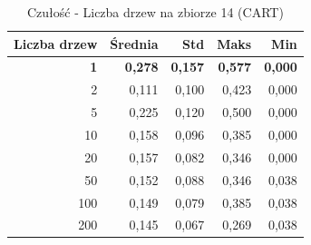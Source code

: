 \begin{table}[htbp]
\centering
\small
\setlength{\tabcolsep}{6pt}
\renewcommand{\arraystretch}{1.2}
\caption{Czułość - Liczba drzew na zbiorze 14 (CART)}
\label{tab:CART_tree_count_14_recall}
\begin{tabular}{r|r|r|r|r}
\toprule
Liczba drzew & Średnia & Std & Maks & Min \\
\hline
\textbf{1} & \textbf{0,278} & \textbf{0,157} & \textbf{0,577} & \textbf{0,000} \\
2 & 0,111 & 0,100 & 0,423 & 0,000 \\
5 & 0,225 & 0,120 & 0,500 & 0,000 \\
10 & 0,158 & 0,096 & 0,385 & 0,000 \\
20 & 0,157 & 0,082 & 0,346 & 0,000 \\
50 & 0,152 & 0,088 & 0,346 & 0,038 \\
100 & 0,149 & 0,079 & 0,385 & 0,038 \\
200 & 0,145 & 0,067 & 0,269 & 0,038 \\
\bottomrule
\end{tabular}
\end{table}